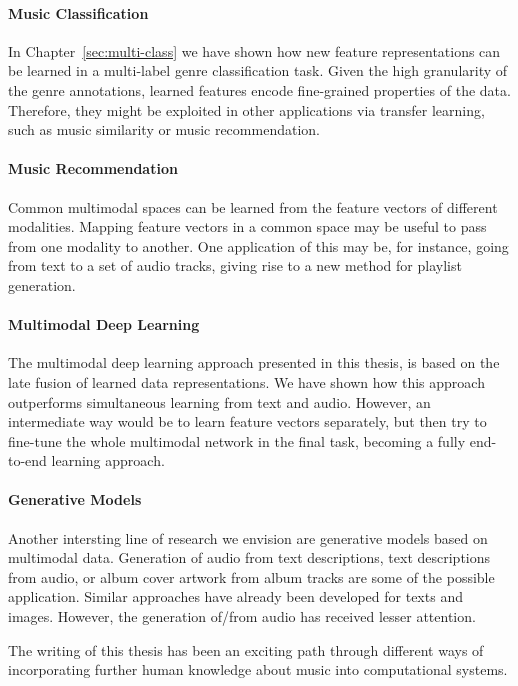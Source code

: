 \paragraph{Music Classification} In Chapter~\ref{sec:multi-class} we have shown how new feature representations can be learned in a multi-label genre classification task. Given the high granularity of the genre annotations, learned features encode fine-grained properties of the data. Therefore, they might be exploited in other applications via transfer learning, such as music similarity or music recommendation. 

\paragraph{Music Recommendation} Common multimodal spaces can be learned from the feature vectors of different modalities. Mapping feature vectors in a common space may be useful to pass from one modality to another. One application of this may be, for instance, going from text to a set of audio tracks, giving rise to a new method for playlist generation.

\paragraph{Multimodal Deep Learning}
The multimodal deep learning approach presented in this thesis, is based on the late fusion of learned data representations. We have shown how this approach outperforms simultaneous learning from text and audio. However, an intermediate way would be to learn feature vectors separately, but then try to fine-tune the whole multimodal network in the final task, becoming a fully end-to-end learning approach.

\paragraph{Generative Models} Another intersting line of research we envision are generative models based on multimodal data. Generation of audio from text descriptions, text descriptions from audio, or album cover artwork from album tracks are some of the possible application. Similar approaches have already been developed for texts and images. However, the generation of/from audio has received lesser attention.

The writing of this thesis has been an exciting path through different ways of incorporating further human knowledge about music into computational systems.